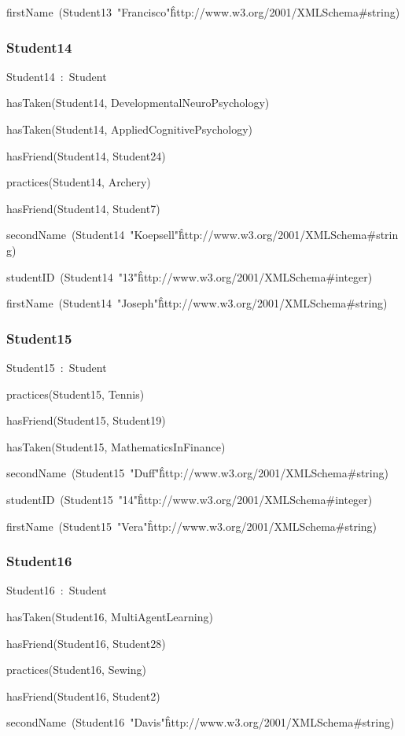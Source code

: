 \documentclass{article}
\begin{document}
firstName~(Student13~"Francisco"\^\^http://www.w3.org/2001/XMLSchema#string)

\subsubsection*{Student14}

Student14~:~Student

hasTaken(Student14, DevelopmentalNeuroPsychology)

hasTaken(Student14, AppliedCognitivePsychology)

hasFriend(Student14, Student24)

practices(Student14, Archery)

hasFriend(Student14, Student7)

secondName~(Student14~"Koepsell"\^\^http://www.w3.org/2001/XMLSchema#string)

studentID~(Student14~"13"\^\^http://www.w3.org/2001/XMLSchema#integer)

firstName~(Student14~"Joseph"\^\^http://www.w3.org/2001/XMLSchema#string)

\subsubsection*{Student15}

Student15~:~Student

practices(Student15, Tennis)

hasFriend(Student15, Student19)

hasTaken(Student15, MathematicsInFinance)

secondName~(Student15~"Duff"\^\^http://www.w3.org/2001/XMLSchema#string)

studentID~(Student15~"14"\^\^http://www.w3.org/2001/XMLSchema#integer)

firstName~(Student15~"Vera"\^\^http://www.w3.org/2001/XMLSchema#string)

\subsubsection*{Student16}

Student16~:~Student

hasTaken(Student16, MultiAgentLearning)

hasFriend(Student16, Student28)

practices(Student16, Sewing)

hasFriend(Student16, Student2)

secondName~(Student16~"Davis"\^\^http://www.w3.org/2001/XMLSchema#string)
\end{document}

